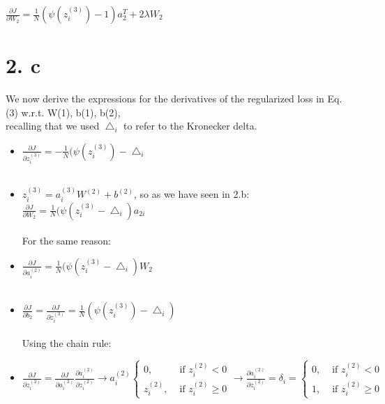 \documentclass[
	12pt, %
]{fphw}
\begin{document}
$\frac{\partial J}{\partial W_2} = \frac{1}{N} (\psi(z_{i}^{(3)}) - 1) a_{2}^{T} + 2\lambda W_2$


\newpage
\section* {2. c}

We now derive the expressions for the derivatives of the regularized loss in Eq. (3) w.r.t. W(1), b(1), b(2),\\
recalling that we used $\bigtriangleup_i$ to refer to the Kronecker delta. \\

\begin{itemize}

\item $\frac{\partial J}{\partial z_{i}^{(3)}} = - \frac{1}{N} (\psi (z_{i}^{(3)}) - \bigtriangleup_i$ \\ \\

\item $z_{i}^{(3)} = a_{i}^{(3)} W^{(2)} + b^{(2)}$, so as we have seen in 2.b: \\ 

$\frac {\partial J}{\partial W_2} = \frac {1}{N} (\psi (z_{i}^{(3)} - \bigtriangleup_i) a_{2i} $\\ \\

For the same reason:

\item $\frac {\partial J}{\partial a_{i}^{(2)}} = \frac{1}{N} (\psi (z_{i}^{(3)} - \bigtriangleup_i) W_2$ \\	\\

\item $\frac {\partial J}{\partial b_2} = \frac {\partial J}{\partial z_{i}^{(3)}} = \frac{1}{N} (\psi(z_{i}^{(3)}) - \bigtriangleup_i)$ \\ \\

Using the chain rule:

\item $\frac {\partial J}{\partial z_{i}^{(2)}} = \frac {\partial J}{\partial a_{i}^{(2)}} \frac {\partial a_{i}^{(2)}}{\partial z_{i}^{(2)}} \rightarrow a_{i}^{(2)}\left\{\begin{array}{ll}
0, & \text { if } z_{i}^{(2)}<0 \\
z_{i}^{(2)}, & \text { if } z_{i}^{(2)}\geq0
\end{array}\right.
\rightarrow \frac {\partial a_{i}^{(2)}}{\partial z_{i}^{(2)}} = \delta_i = 
\left\{\begin{array}{ll}
0, & \text { if } z_{i}^{(2)}<0 \\
1, & \text { if } z_{i}^{(2)}\geq0
\end{array}\right.
$ \\


\end{itemize}
\end{document}
